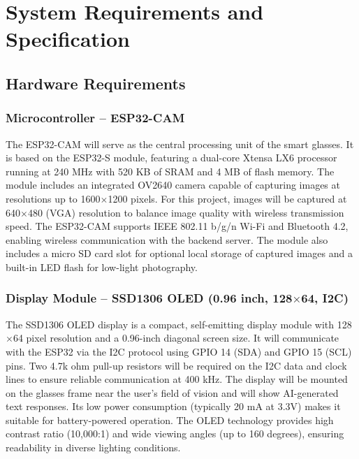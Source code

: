 \chapter{System Requirements and Specification}

\section{Hardware Requirements}

\subsection{Microcontroller -- ESP32-CAM}
The ESP32-CAM will serve as the central processing unit of the smart glasses. It is based on the ESP32-S module, featuring a dual-core Xtensa LX6 processor running at 240 MHz with 520 KB of SRAM and 4 MB of flash memory. The module includes an integrated OV2640 camera capable of capturing images at resolutions up to 1600$\times$1200 pixels. For this project, images will be captured at 640$\times$480 (VGA) resolution to balance image quality with wireless transmission speed. The ESP32-CAM supports IEEE 802.11 b/g/n Wi-Fi and Bluetooth 4.2, enabling wireless communication with the backend server. The module also includes a micro SD card slot for optional local storage of captured images and a built-in LED flash for low-light photography.

\subsection{Display Module -- SSD1306 OLED (0.96 inch, 128$\times$64, I2C)}
The SSD1306 OLED display is a compact, self-emitting display module with 128$\times$64 pixel resolution and a 0.96-inch diagonal screen size. It will communicate with the ESP32 via the I2C protocol using GPIO 14 (SDA) and GPIO 15 (SCL) pins. Two 4.7k ohm pull-up resistors will be required on the I2C data and clock lines to ensure reliable communication at 400 kHz. The display will be mounted on the glasses frame near the user's field of vision and will show AI-generated text responses. Its low power consumption (typically 20 mA at 3.3V) makes it suitable for battery-powered operation. The OLED technology provides high contrast ratio (10,000:1) and wide viewing angles (up to 160 degrees), ensuring readability in diverse lighting conditions.

